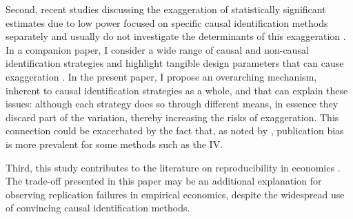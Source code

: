 			Second, recent studies discussing the exaggeration of statistically significant estimates due to low power focused on specific causal identification methods separately and usually do not investigate the determinants of this exaggeration \citep{schell_evaluating_2018, black_simulated_2021, stommes_reliability_2021, young_leverage_2021}.  In a companion paper, I consider a wide range of causal and non-causal identification strategies and highlight tangible design parameters that can cause exaggeration \citep{bagilet_accurately_2023}. In the present paper, I propose an overarching mechanism, inherent to causal identification strategies as a whole, and that can explain these issues: although each strategy does so through different means, in essence they discard part of the variation, thereby increasing the risks of exaggeration. This connection could be exacerbated by the fact that, as noted by \cite{brodeur_methods_2020}, publication bias is more prevalent for some methods such as the IV. 
			
			Third, this study contributes to the literature on reproducibility in economics \citep{camerer_evaluating_2016, ioannidis_power_2017, christensen_transparency_2018, kasy_forking_2021}. The trade-off presented in this paper may be an additional explanation for observing replication failures in empirical economics, despite the widespread use of convincing causal identification methods.

	
	
		